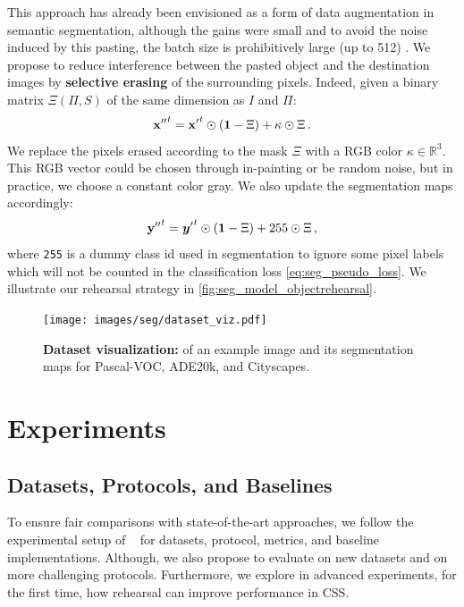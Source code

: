 This approach has already been envisioned as a form of data augmentation in semantic segmentation,
although the gains were small and to avoid the noise induced by this pasting, the batch size is
prohibitively large (up to 512) \citep{ghiasi2020simplecopypaste}. We propose to reduce interference
between the pasted object and the destination images by \textbf{selective erasing} of the
surrounding pixels. Indeed, given a binary matrix $\Xi(\Pi, S)$ of the same dimension as $I$ and
$\Pi$:
%
\begin{equation}
    {\mathbf{x}''}^t = {\mathbf{x}'}^t \odot (\mathbf{1} - \Xi) + \kappa \odot \Xi\,.
    \label{eq:seg_erasing_pixel}
\end{equation}
%
We replace the pixels erased according to the mask $\Xi$ with a RGB color $\kappa \in \mathbb{R}^3$.
This RGB vector could be chosen through in-painting \citep{fang2019instaboost} or be random noise,
but in practice, we choose a constant color gray. We also update the segmentation maps accordingly:
%
\begin{equation}
    {\mathbf{y}''}^t = {{\bm{y}}'}^t \odot (\mathbf{1} - \Xi) + 255 \odot \Xi\,,
    \label{eq:seg_erasing_label}
\end{equation}
%
\noindent where \texttt{255} is a dummy class id used in segmentation to ignore some pixel labels
which will not be counted in the classification loss \autoref{eq:seg_pseudo_loss}. We illustrate our
rehearsal strategy in \autoref{fig:seg_model_objectrehearsal}.



\begin{figure}
    \centering
    \texttt{[image: images/seg/dataset\_viz.pdf]}
    \caption{\textbf{Dataset visualization:} of an example image and its segmentation maps for Pascal-VOC, ADE20k, and Cityscapes.}
    \label{fig:seg_dataset_viz}
\end{figure}

\section{Experiments}
\label{sec:seg_exp}

\subsection{Datasets, Protocols, and Baselines}
\label{sec:seg_datasets_protocols}

To ensure fair comparisons with state-of-the-art approaches, we follow the experimental setup of
~\cite{cermelli2020modelingthebackground} for datasets, protocol, metrics, and baseline
implementations. Although, we also propose to evaluate on new datasets and on more challenging
protocols. Furthermore, we explore in advanced experiments, for the first time, how rehearsal can
improve performance in \ac{CSS}.

